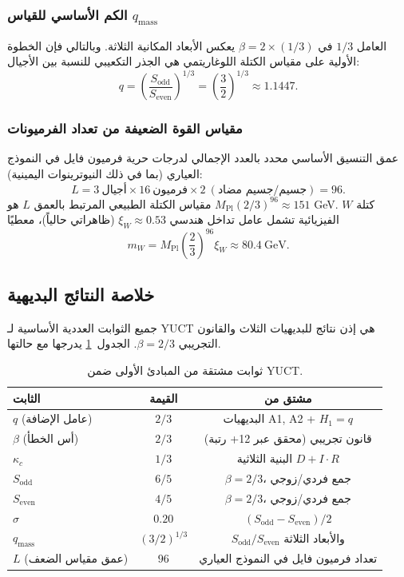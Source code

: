 \documentclass[11pt,a4paper]{article}
\begin{document}
	\subsubsection{الكم الأساسي للقياس \(q_{\text{mass}}\)}
	العامل \(1/3\) في \(\beta = 2 \times (1/3)\) يعكس الأبعاد المكانية الثلاثة. وبالتالي فإن الخطوة الأولية على مقياس الكتلة اللوغاريتمي هي الجذر التكعيبي للنسبة بين الأجيال:
	\[
	\boxed{q = \left(\frac{S_{\mathrm{odd}}}{S_{\mathrm{even}}}\right)^{1/3} = \left(\frac{3}{2}\right)^{1/3} \approx 1.1447}.
	\]
	
	\subsubsection{مقياس القوة الضعيفة من تعداد الفرميونات}
	عمق التنسيق الأساسي محدد بالعدد الإجمالي لدرجات حرية فرميون فايل في النموذج العياري (بما في ذلك النيوترينوات اليمينية):
	\[
	L = 3\ \text{أجيال} \times 16\ \text{فرميون} \times 2\ (\text{جسيم/جسيم مضاد}) = 96.
	\]
	مقياس الكتلة الطبيعي المرتبط بالعمق \(L\) هو \(M_{\mathrm{Pl}} (2/3)^{96} \approx 151\) GeV. كتلة \(W\) الفيزيائية تشمل عامل تداخل هندسي \(\xi_W \approx 0.53\) (ظاهراتي حالياً)، معطيًا
	\[
	m_W = M_{\mathrm{Pl}} \left(\frac{2}{3}\right)^{96} \xi_W \approx 80.4\ \text{GeV}.
	\]
	
	\subsection{خلاصة النتائج البديهية}
	
	جميع الثوابت العددية الأساسية لـ YUCT هي إذن نتائج للبديهيات الثلاث والقانون التجريبي \(\beta=2/3\). الجدول~\ref{tab:derived-constants} يدرجها مع حالتها.
	
	\begin{table}[H]
		\centering
		\caption{ثوابت مشتقة من المبادئ الأولى ضمن YUCT.}
		\label{tab:derived-constants}
		\begin{tabular}{l c c}
			\toprule
			\textbf{الثابت} & \textbf{القيمة} & \textbf{مشتق من} \\
			\midrule
			\(q\) (عامل الإضافة) & \(2/3\) & البديهيات A1, A2 + \(H_1=q\) \\
			\(\beta\) (أس الخطأ) & \(2/3\) & قانون تجريبي (محقق عبر 12+ رتبة) \\
			\(\kappa_c\) & \(1/3\) & البنية الثلاثية \(D+I\!\cdot\!R\) \\
			\(S_{\mathrm{odd}}\) & \(6/5\) & \(\beta=2/3\)، جمع فردي/زوجي \\
			\(S_{\mathrm{even}}\) & \(4/5\) & \(\beta=2/3\)، جمع فردي/زوجي \\
			\(\sigma\) & \(0.20\) & \((S_{\mathrm{odd}}-S_{\mathrm{even}})/2\) \\
			\(q_{\text{mass}}\) & \((3/2)^{1/3}\) & \(S_{\mathrm{odd}}/S_{\mathrm{even}}\) والأبعاد الثلاثة \\
			\(L\) (عمق مقياس الضعف) & \(96\) & تعداد فرميون فايل في النموذج العياري \\
			\bottomrule
		\end{tabular}
	\end{table}
	
\end{document}
